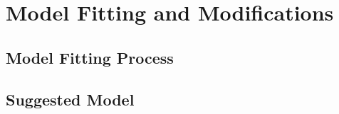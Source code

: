 \chapter{Model Fitting and Modifications}



\section{Model Fitting Process}

\section{Suggested Model}